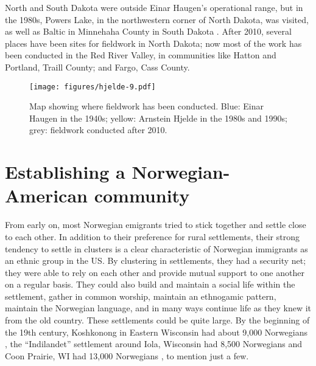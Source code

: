 \documentclass[output=paper]{langscibook}
\begin{document}
North and South Dakota were outside Einar Haugen’s operational range, but in the 1980s, Powers Lake, in the northwestern corner of North Dakota, was visited, as well as Baltic in Minnehaha County in South Dakota \citep{Hjelde1992}. After 2010, several places have been sites for fieldwork in North Dakota; now most of the work has been conducted in the Red River Valley, in communities like Hatton and Portland, Traill County; and Fargo, Cass County.  

\begin{figure}
\texttt{[image: figures/hjelde-9.pdf]}
\caption{Map showing where fieldwork has been conducted. Blue: Einar Haugen in the 1940s; yellow: Arnstein Hjelde in the 1980s and 1990s; grey: fieldwork conducted after 2010.}
\label{fig:hjelde:9}
\end{figure}

\section{Establishing a Norwegian-American community}\label{sec:hjelde:5}

From early on, most Norwegian emigrants tried to stick together and settle close to each other. In addition to their preference for rural settlements, their strong tendency to settle in clusters is a clear characteristic of Norwegian immigrants as an ethnic group in the US. By clustering in settlements, they had a security net; they were able to rely on each other and provide mutual support to one another on a regular basis. They could also build and maintain a social life within the settlement, gather in common worship, maintain an ethnogamic pattern, maintain the Norwegian language, and in many ways continue life as they knew it from the old country. These settlements could be quite large. By the beginning of the 19th century, Koshkonong in Eastern Wisconsin had about 9,000 Norwegians \citep[142]{Holand1908}, the “Indilandet” settlement around Iola, Wisconsin had 8,500 Norwegians \citep[206]{Holand1908} and Coon Prairie, WI had 13,000 Norwegians \citep[267]{Holand1908}, to mention just a few. 
\end{document}
